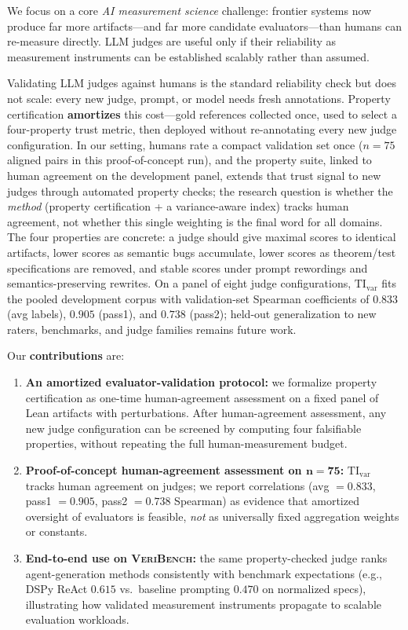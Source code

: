 \documentclass{article}
\begin{document}
We focus on a core \emph{AI measurement science} challenge: frontier systems now produce far more artifacts---and far more candidate evaluators---than humans can re-measure directly. LLM judges are useful only if their reliability as measurement instruments can be established scalably rather than assumed.

Validating LLM judges against humans is the standard reliability check but does not scale: every new judge, prompt, or model needs fresh annotations.
Property certification \textbf{amortizes} this cost---gold references collected once, used to select a four-property trust metric, then deployed without re-annotating every new judge configuration.
In our setting, humans rate a compact validation set once (\(n {=} 75\) aligned pairs in this proof-of-concept run), and the property suite, linked to human agreement on the development panel, extends that trust signal to new judges through automated property checks; the research question is whether the \emph{method} (property certification + a variance-aware index) tracks human agreement, not whether this single weighting is the final word for all domains.
The four properties are concrete: a judge should give maximal scores to identical artifacts, lower scores as semantic bugs accumulate, lower scores as theorem/test specifications are removed, and stable scores under prompt rewordings and semantics-preserving rewrites.
On a panel of eight judge configurations, \(\mathrm{TI}_{\mathrm{var}}\) fits the pooled development corpus with validation-set Spearman coefficients of \(0.833\) (avg labels), \(0.905\) (pass1), and \(0.738\) (pass2); held-out generalization to new raters, benchmarks, and judge families remains future work.

Our \textbf{contributions} are:
\begin{enumerate}
  \item \textbf{An amortized evaluator-validation protocol:} we formalize property certification as one-time human-agreement assessment on a fixed panel of Lean artifacts with perturbations. After human-agreement assessment, any new judge configuration can be screened by computing four falsifiable properties, without repeating the full human-measurement budget.

  \item \textbf{Proof-of-concept human-agreement assessment on \(\bm{n{=}75}\):} \(\mathrm{TI}_{\mathrm{var}}\) tracks human agreement on judges; we report correlations (avg \(=0.833\), pass1 \(=0.905\), pass2 \(=0.738\) Spearman) as evidence that amortized oversight of evaluators is feasible, \emph{not} as universally fixed aggregation weights or constants.
  \item \textbf{End-to-end use on \textsc{VeriBench}:} the same property-checked judge ranks agent-generation methods consistently with benchmark expectations (e.g., DSPy ReAct \(0.615\) vs.\ baseline prompting \(0.470\) on normalized specs), illustrating how validated measurement instruments propagate to scalable evaluation workloads.
\end{enumerate}
\end{document}
